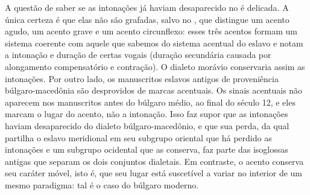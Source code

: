 A questão de saber se as intonações já haviam desaparecido no  é delicada.
A única certeza é que elas não são grafadas, salvo no , que
distingue um acento agudo, um acento grave e um acento circunflexo: esses três
acentos formam um sistema coerente com aquele que sabemos do sistema acentual do
eslavo e notam a intonação e duração de certas vogais (duração secundária
causada por alongamento compensatório e contração).
O dialeto morávio conservaria assim as intonações.
Por outro lado, os manuscritos eslavos antigos de proveniência búlgaro-macedônia
são desprovidos de marcas acentuais.
Os sinais acentuais não aparecem nos manuscritos antes do búlgaro médio, ao
final do século 12, e eles marcam o lugar do acento, não a intonação.
Isso faz supor que as intonações haviam desaparecido do dialeto
búlgaro-macedônio, e que sua perda, da qual partilha o eslavo meridional em seu
subgrupo oriental que há perdido as intonações e um subgrupo ocidental que as
conserva, faz parte das isoglossas antigas que separam os dois conjuntos dialetais.
Em contraste, o acento conserva seu caráter móvel, isto é, que seu lugar está
suscetível a variar no interior de um mesmo paradigma: tal é o caso do búlgaro
moderno.
